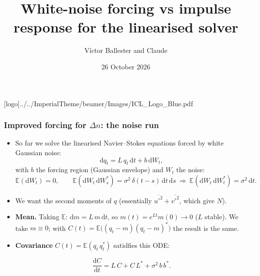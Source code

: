 \documentclass[
  aspectratio=169,
  t,
  onlytextwidth,
  10pt,
]{beamer}
\title{White-noise forcing vs impulse response for the linearised solver}
\author{Víctor Ballester and Claude}
\date{26 October 2026}
\def\imagefolder{../../ImperialTheme/beamer/Images}
\newcommand{\dd}{\mathrm{d}}
\newcommand{\E}{\mathbb{E}}
\begin{document}
\begingroup
{}
[logo]{\imagefolder/ICL_Logo_Blue.pdf}
\frame[plain, s]{\titlepage}
\endgroup

\begin{frame}
	\frametitle{Improved forcing for $\Delta n$: the noise run}
	\begin{itemize}
		\item So far we solve the linearised Navier--Stokes equations forced by white Gaussian noise:
		      \[
			      \dd q_t = L\,q_t\,\dd t + b\,\dd W_t ,
		      \]
		      with $b$ the forcing region (Gaussian envelope) and $W_t$ the noise:
		      \[
			      \E(\dd W_t)=0,\qquad
			      \E(\dd W_t\,\dd W_s^*)=\sigma^2\,\delta(t-s)\,\dd t\,\dd s
			      \ \Rightarrow\ \E(\dd W_t\,\dd W_t^*)=\sigma^2\,\dd t .
		      \]
		\item We want the second moments of $q$ (essentially $\overline{u'^2}+\overline{v'^2}$, which give $N$).
		\item \textbf{Mean.} Taking $\E$: $\dd m = L\,m\,\dd t$, so $m(t)=e^{Lt}m(0)\to 0$ ($L$ stable). We take $m\equiv 0$; with $C(t)=\E\big((q_t-m)(q_t-m)^*\big)$ the result is the same.

		\item \textbf{Covariance} $C(t)=\E(q_t\,q_t^*)$ satidfies this ODE:

\[
			      \frac{\dd C}{\dd t} = L\,C + C\,L^* + \sigma^2\,b\,b^* .
		      \]
	\end{itemize}
\end{frame}
\end{document}

